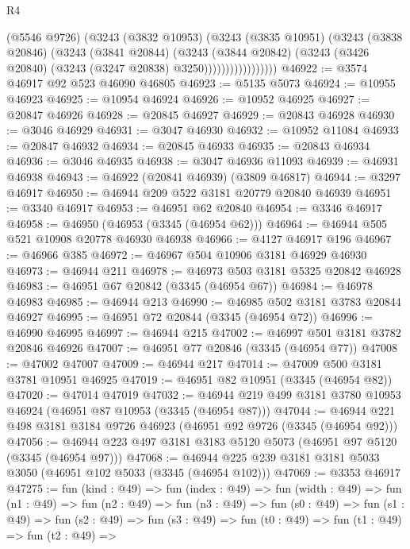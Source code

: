 \begin{lexlean}{R4}
\begin{coremodule}
                        (@5546 @9726)
                        (@3243
                          (@3832 @10953)
                          (@3243
                            (@3835 @10951)
                            (@3243
                              (@3838 @20846)
                              (@3243
                                (@3841 @20844)
                                (@3243
                                  (@3844 @20842)
                                  (@3243 (@3426 @20840) (@3243 (@3247 @20838) @3250)))))))))))))))))
@46922 := @3574 @46917 @92 @523 @46090 @46805
@46923 := @5135 @5073
@46924 := @10955 @46923
@46925 := @10954 @46924
@46926 := @10952 @46925
@46927 := @20847 @46926
@46928 := @20845 @46927
@46929 := @20843 @46928
@46930 := @3046 @46929
@46931 := @3047 @46930
@46932 := @10952 @11084
@46933 := @20847 @46932
@46934 := @20845 @46933
@46935 := @20843 @46934
@46936 := @3046 @46935
@46938 := @3047 @46936 @11093
@46939 := @46931 @46938
@46943 := @46922 (@20841 @46939) (@3809 @46817)
@46944 := @3297 @46917
@46950 := @46944 @209 @522 @3181 @20779 @20840 @46939
@46951 := @3340 @46917
@46953 := @46951 @62 @20840
@46954 := @3346 @46917
@46958 := @46950 (@46953 (@3345 (@46954 @62)))
@46964 := @46944 @505 @521 @10908 @20778 @46930 @46938
@46966 := @4127 @46917 @196
@46967 := @46966 @385
@46972 := @46967 @504 @10906 @3181 @46929 @46930
@46973 := @46944 @211
@46978 := @46973 @503 @3181 @5325 @20842 @46928
@46983 := @46951 @67 @20842 (@3345 (@46954 @67))
@46984 := @46978 @46983
@46985 := @46944 @213
@46990 := @46985 @502 @3181 @3783 @20844 @46927
@46995 := @46951 @72 @20844 (@3345 (@46954 @72))
@46996 := @46990 @46995
@46997 := @46944 @215
@47002 := @46997 @501 @3181 @3782 @20846 @46926
@47007 := @46951 @77 @20846 (@3345 (@46954 @77))
@47008 := @47002 @47007
@47009 := @46944 @217
@47014 := @47009 @500 @3181 @3781 @10951 @46925
@47019 := @46951 @82 @10951 (@3345 (@46954 @82))
@47020 := @47014 @47019
@47032 := @46944 @219 @499 @3181 @3780 @10953 @46924 (@46951 @87 @10953 (@3345 (@46954 @87)))
@47044 := @46944 @221 @498 @3181 @3184 @9726 @46923 (@46951 @92 @9726 (@3345 (@46954 @92)))
@47056 := @46944 @223 @497 @3181 @3183 @5120 @5073 (@46951 @97 @5120 (@3345 (@46954 @97)))
@47068 := @46944 @225 @239 @3181 @3181 @5033 @3050 (@46951 @102 @5033 (@3345 (@46954 @102)))
@47069 := @3353 @46917
@47275 := fun (kind : @49) =>
  fun (index : @49) =>
  fun (width : @49) =>
  fun (n1 : @49) =>
  fun (n2 : @49) =>
  fun (n3 : @49) =>
  fun (s0 : @49) =>
  fun (s1 : @49) =>
  fun (s2 : @49) =>
  fun (s3 : @49) =>
  fun (t0 : @49) =>
  fun (t1 : @49) =>
  fun (t2 : @49) =>

\end{coremodule}
\end{lexlean}
